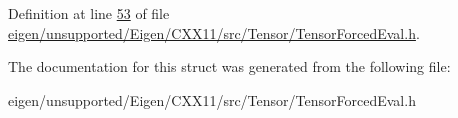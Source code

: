 Definition at line \hyperlink{eigen_2unsupported_2_eigen_2_c_x_x11_2src_2_tensor_2_tensor_forced_eval_8h_source_l00053}{53} of file \hyperlink{eigen_2unsupported_2_eigen_2_c_x_x11_2src_2_tensor_2_tensor_forced_eval_8h_source}{eigen/unsupported/\+Eigen/\+C\+X\+X11/src/\+Tensor/\+Tensor\+Forced\+Eval.\+h}.



The documentation for this struct was generated from the following file\+:\begin{DoxyCompactItemize}
\item 
eigen/unsupported/\+Eigen/\+C\+X\+X11/src/\+Tensor/\+Tensor\+Forced\+Eval.\+h\end{DoxyCompactItemize}
